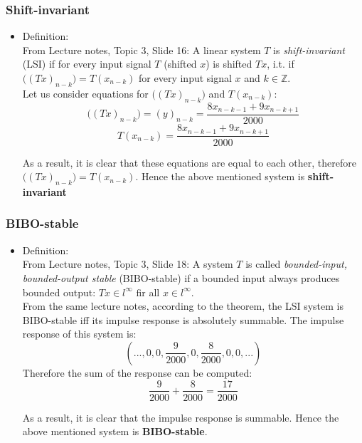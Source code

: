 \documentclass[12pt,a4paper]{article}
\begin{document}
  \subsubsection{Shift-invariant}
    \begin{itemize}
        \item Definition:\\
    From Lecture notes, Topic 3, Slide 16: A linear system $T$ is \emph{shift-invariant} (LSI) if for every input signal $T$ (shifted $x$) is shifted $Tx$, i.t. if $\big((Tx)_{n-k}\big)=T(x_{n-k})$ for every input signal $x$ and $k\in\mathbb{Z}$.
    \\
    
    Let us consider equations for $\big((Tx)_{n-k}\big)$ and $T(x_{n-k})$:
    $$\big((Tx)_{n-k}\big)=(y)_{n-k}=\frac{8x_{n-k-1}+9x_{n-k+1}}{2000}$$
    $$T(x_{n-k})=\frac{8x_{n-k-1}+9x_{n-k+1}}{2000}$$
    
    As a result, it is clear that these equations are equal to each other, therefore $\big((Tx)_{n-k}\big)=T(x_{n-k})$. Hence the above mentioned system is \textbf{shift-invariant}
    \end{itemize}
    
    
    
  
    
    \subsubsection{BIBO-stable}
    \begin{itemize}
        \item  Definition: \\ 
    From Lecture notes, Topic 3, Slide 18: A system $T$ is called \emph{ bounded-input, bounded-output stable} (BIBO-stable) if a bounded input always produces bounded output: $Tx\in l^{\infty}$ fir all $x\in l^{\infty}$.
    \\
    
     From the same lecture notes, according to the theorem, the LSI system is BIBO-stable iff its impulse response is absolutely summable. The impulse response of this system is:
    $$(..., 0, 0, \frac{9}{2000}, 0, \frac{8}{2000}, 0, 0, ...)$$
    Therefore the sum of the response can be computed:
    $$\frac{9}{2000}+\frac{8}{2000}=\frac{17}{2000}$$
    
    As a result, it is clear that the impulse response is summable. Hence the above mentioned system is \textbf{BIBO-stable}.

    \end{itemize}
   
\end{document}
